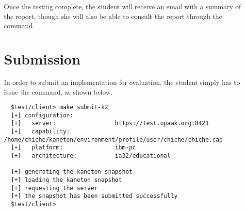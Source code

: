 Once the testing complete, the student will receive an email with a summary
of the report, though she will also be able to consult the report through
the  command.

%
%

\section{Submission}

In order to submit an implementation for evaluation, the student simply
has to issue the  command, as shown below.

\begin{verbatim}
  $test/client> make submit-k2
  [+] configuration:
  [+]   server:                 https://test.opaak.org:8421
  [+]   capability:             /home/chiche/kaneton/environment/profile/user/chiche/chiche.cap
  [+]   platform:               ibm-pc
  [+]   architecture:           ia32/educational

  [+] generating the kaneton snapshot
  [+] loading the kaneton snapshot
  [+] requesting the server
  [+] the snapshot has been submitted successfully
  $test/client> 
\end{verbatim}
